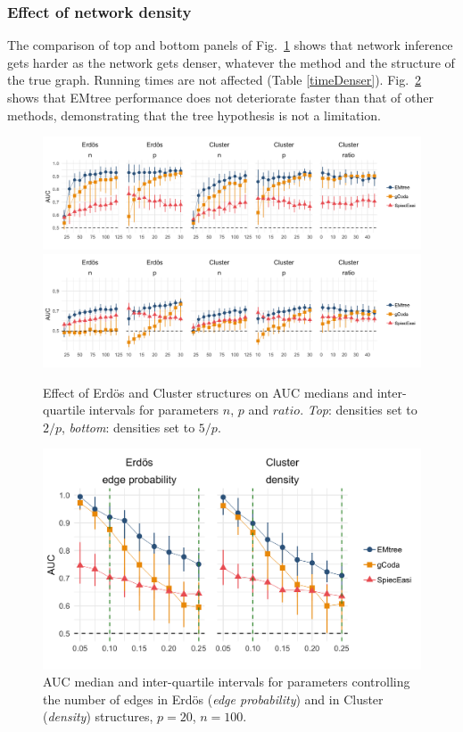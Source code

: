
\subsubsection{Effect of network density}
The comparison of top and bottom panels of Fig.~\ref{panelErdClust} shows that network inference gets harder as the network gets denser, whatever the method and the structure of the true graph. Running times are not affected (Table \ref{timeDenser}).
Fig.~\ref{varyDens} shows that EMtree performance does not deteriorate faster than that of other methods, demonstrating that the tree hypothesis is not a limitation.


 \begin{figure}[H]
  \centering
   \includegraphics[width=\linewidth]{figs/panel_npFav.png}
  \includegraphics[width=\linewidth]{figs/panel_dense.png}
  \caption{Effect of Erdös and Cluster structures on AUC medians and inter-quartile intervals for parameters $n$, $p$ and $ratio$. \textit{Top}: densities set to $2/p$, \textit{bottom}: densities set to $5/p$.}
  \label{panelErdClust}
\end{figure}

\begin{figure}[H]
 \centering
  \includegraphics[width=0.6\linewidth]{figs/panel_dens_seuils.png}
  \caption{AUC median and inter-quartile intervals for parameters controlling the number of edges in Erdös (\textit{edge probability}) and in Cluster (\textit{density}) structures, $p=20$, $n=100$.}
  \label{varyDens}
\end{figure}
 
